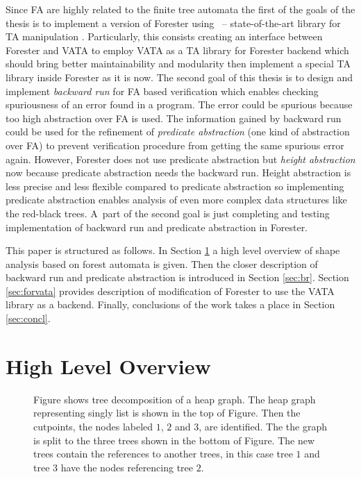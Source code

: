 \documentclass[fleqn,11pt]{ExcelAtFIT} %
\begin{document}
Since FA are highly related to the finite tree automata the first of the goals of the thesis is to implement
a version of Forester using \vata\ -- state-of-the-art library for TA manipulation \cite{libvata}.
Particularly, this consists creating an interface between Forester and VATA to employ VATA as a TA library for Forester backend
which should bring better maintainability and modularity then implement a special TA library inside Forester as it is now.
The second goal of this thesis is to design and implement \emph{backward run} for FA based verification
which enables checking spuriousness of an error found in a program.
The error could be spurious because too high abstraction over FA is used.
The information gained by backward run could be used for the refinement of \emph{predicate abstraction} (one kind of abstraction over FA)
to prevent verification procedure from getting the same spurious error again.
However, Forester does not use predicate abstraction but \emph{height abstraction} now
because predicate abstraction needs the backward run.
Height abstraction is less precise and less flexible compared to predicate abstraction so implementing predicate abstraction
enables analysis of even more complex data structures like the red-black trees.
A~part of the second goal is just completing and testing implementation of backward run and predicate abstraction in Forester.

This paper is structured as follows.
In Section \ref{sec:overview} a high level overview of shape analysis based on forest automata
is given.
Then the closer description of backward run and predicate abstraction is introduced in Section \ref{sec:br}.
Section \ref{sec:forvata} provides description of modification of Forester to use the VATA library as a backend.
Finally, conclusions of the work takes a place in Section \ref{sec:concl}.

\section{High Level Overview}
\label{sec:overview}

\begin{figure}[t]
	\centering
	
	
	\vspace{0.5cm}
	
	
	\caption{
	Figure shows tree decomposition of a heap graph.
    The heap graph representing singly list is shown in the top of Figure.
	Then the cutpoints, the nodes labeled $1$, $2$ and $3$, are identified.
	The the graph is split to the three trees shown in the bottom of Figure.
	The new trees contain the references to another trees, in this case tree $1$ and tree $3$
	have the nodes referencing tree $2$.}
	\label{fig:KeepCalm}
\end{figure}
\end{document}
